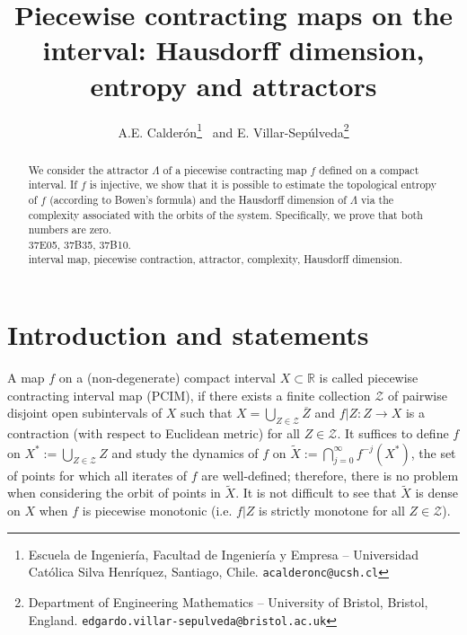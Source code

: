 \documentclass[a4paper]{article}
\title{Piecewise contracting maps on the interval: Hausdorff dimension, entropy and attractors}
\author{A.E. Calderón\footnote{Escuela de Ingeniería, Facultad de Ingeniería y Empresa -- Universidad Católica Silva Henríquez, Santiago, Chile. {\tt acalderonc@ucsh.cl}} \ and E. Villar-Sepúlveda\footnote{Department of Engineering Mathematics -- University of Bristol, Bristol, England. {\tt edgardo.villar-sepulveda@bristol.ac.uk}}}
\begin{document}
\maketitle

\begin{abstract}
\noindent We consider the attractor $\Lambda$ of a piecewise contracting map $f$ defined on a compact interval. If $f$ is injective, we show that it is possible to estimate the topological entropy of $f$ (according to Bowen's formula) and the Hausdorff dimension of $\Lambda$ via the complexity associated with the orbits of the system. Specifically, we prove that both numbers are zero.\\

 37E05, 37B35, 37B10.\\
 interval map, piecewise contraction, attractor, complexity, Hausdorff dimension.
\end{abstract}

\section{Introduction and statements}

A map $f$ on a (non-degenerate) compact interval $X\subset\mathbb R$ is called piecewise contracting interval map (PCIM), if there exists a finite collection $\mathcal Z$ of pairwise disjoint open subintervals of $X$ such that $X=\bigcup_{\scriptscriptstyle Z\in\mathcal Z}\overline{Z}$ and $f|Z:Z\to X$ is a contraction ({with respect to} Euclidean metric) for all $Z\in\mathcal Z$. It suffices to define $f$ on $X^*:=\bigcup_{\scriptscriptstyle Z\in\mathcal Z}Z$ and study the dynamics of $f$ on $\widetilde X:=\bigcap_{j=0}^\infty f^{-j}(X^*)$, the set of points for which all iterates of $f$ are well-defined; therefore, there is no pro\-blem when considering the orbit of points in $\widetilde X$. It is not difficult to see that $\widetilde X$ is dense on $X$ when $f$ is piecewise monotonic (i.e. $f|Z$ is strictly monotone for all $Z\in\mathcal Z$). 
\end{document}

